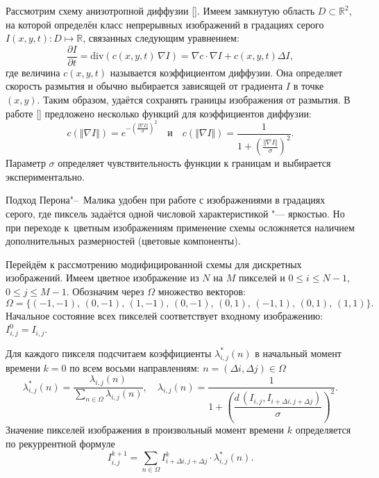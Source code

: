 Рассмотрим схему анизотропной диффузии []. 
Имеем замкнутую область $D \subset \mathbb{R}^2$, на которой определён класс непрерывных изображений в градациях 
серого \mbox{$I (x, y, t) : D \mapsto \mathbb{R}$}, связанных следующим уравнением:
$$
\frac{\partial I}{\partial t} = \mbox{div} \left( c(x, y, t) \, \nabla I \right) =
\nabla c \cdot \nabla I + c(x, y, t) \Delta I,
$$
где величина $c(x, y, t)$ называется коэффициентом диффузии. 
Она определяет скорость размытия и обычно выбирается зависящей от градиента $I$ в точке $(x, y)$. Таким образом, удаётся
сохранять границы изображения от размытия. 
В работе [] предложено  несколько функций для коэффициентов диффузии:
$$
c \left( \Vert \nabla I \Vert \right) = e^{-\left( \tfrac{\Vert \nabla I \Vert}{\sigma} \right)^2}
\quad
\mbox{и}
\quad
c \left( \Vert \nabla I \Vert \right) = \dfrac{1}{1 + \left( \frac{\Vert \nabla I \Vert}{\sigma} \right)^2 }.
$$
Параметр $\sigma$ определяет чувствительность функции к границам и выбирается экспериментально.

Подход Перона"--~Малика удобен при работе с изображениями в градациях серого, где пиксель задаётся одной числовой характеристикой "--- яркостью. 
Но при переходе к~цветным изображениям применение схемы осложняется наличием дополнительных размерностей (цветовые компоненты). 

Перейдём к рассмотрению модифицированной схемы для дискретных изображений.
Имеем цветное изображение из $N$ на $M$ пикселей и
$0 \leq i \leq N-1$, $ 0 \leq j \leq M-1$. Обозначим через $\Omega$ множество векторов:
$$
\Omega = \bigl\lbrace (-1, -1), \, (0, -1), \, (1, -1), \, 
(0, -1), \, (0, 1), \, (-1, 1), \, (0, 1), \, (1, 1) \bigr\rbrace .
$$
Начальное состояние всех пикселей соответствует входному изображению:
$
I_{i, j}^{0} = I_{i, j}.
$

Для каждого пикселя подсчитаем коэффициенты $\lambda_{i, j}^* (n)$ 
в начальный момент времени $k = 0$ по всем восьми направлениям:
$n = (\Delta i, \Delta j) \in \Omega$
$$
\lambda_{i, j}^* (n) = \displaystyle\dfrac{\lambda_{i, j} (n)}{\sum_{n \in \Omega} \lambda_{i, j} (n)}
, \quad
\lambda_{i, j} (n) = \dfrac{1}{1 + \left( \dfrac{d \, ( I_{i, j}, 
I_{i + \Delta i, j + \Delta j} )}{\sigma} \right)^2 }.
$$
Значение пикселей изображения в произвольный момент времени $k$ определяется по рекуррентной формуле
$$
I_{i, j}^{k+1} = \sum_{n \in \Omega} I_{i + \Delta i, j + \Delta j}^k \cdot \lambda_{i, j}^* (n).
$$


